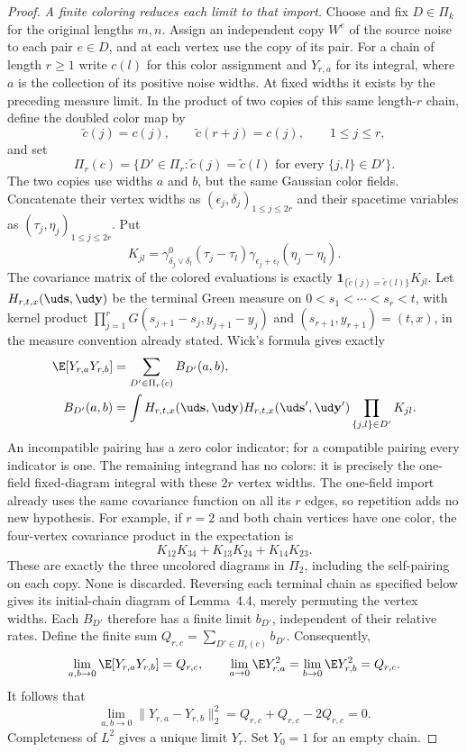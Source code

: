 \begin{proof}
\emph{A finite coloring reduces each limit to that import.}
Choose and fix $D\in\Pi_k$ for the original lengths $m,n$.
Assign an independent copy $W^e$ of the source noise to each pair
$e\in D$, and at each vertex use the copy of its pair. For a chain
of length $r\ge1$ write $c(l)$ for this color assignment and
$Y_{r,a}$ for its integral, where $a$ is the collection of its positive
noise widths. At fixed widths it exists by the preceding measure limit.
In the product of two copies of this same length-$r$ chain, define
the doubled color map by
\[
  \widetilde c(j)=c(j),\qquad
  \widetilde c(r+j)=c(j),\qquad 1\le j\le r,
\]
and set
\[
  \Pi_r(c)=\{D'\in\Pi_r:
  \widetilde c(j)=\widetilde c(l)
  \text{ for every }\{j,l\}\in D'\}.
\]
The two copies use widths $a$ and $b$, but the same Gaussian color
fields. Concatenate their vertex widths as
$(\epsilon_j,\delta_j)_{1\le j\le2r}$ and their spacetime variables
as $(\tau_j,\eta_j)_{1\le j\le2r}$. Put
\[
  K_{jl}=\gamma^0_{\delta_j\vee\delta_l}(\tau_j-\tau_l)
  \gamma_{\epsilon_j+\epsilon_l}(\eta_j-\eta_l).
\]
The covariance matrix of the colored evaluations is exactly
$\mathbf1_{\{\widetilde c(j)=\widetilde c(l)\}}K_{jl}$.
Let $H_{r,t,x}(\ud\mathbf s,\ud\mathbf y)$ be the terminal
Green measure on $0<s_1<\cdots<s_r<t$, with kernel product
$\prod_{j=1}^rG(s_{j+1}-s_j,y_{j+1}-y_j)$ and
$(s_{r+1},y_{r+1})=(t,x)$, in the measure convention already stated.
Wick's formula gives exactly
\[
  \begin{split}
    \E[Y_{r,a}Y_{r,b}]&=\sum_{D'\in\Pi_r(c)}B_{D'}(a,b),\\
    B_{D'}(a,b)&=\int H_{r,t,x}(\ud\mathbf s,\ud\mathbf y)
    H_{r,t,x}(\ud\mathbf s',\ud\mathbf y')
    \prod_{\{j,l\}\in D'}K_{jl}.
  \end{split}
\]
An incompatible pairing has a zero color indicator; for a compatible
pairing every indicator is one. The remaining integrand has no colors:
it is precisely the one-field fixed-diagram integral with these $2r$
vertex widths. The one-field import already uses the same covariance
function on all its $r$ edges, so repetition adds no new hypothesis.
For example, if $r=2$ and both chain vertices have one color, the
four-vertex covariance product in the expectation is
\[
  K_{12}K_{34}+K_{13}K_{24}+K_{14}K_{23}.
\]
These are exactly the three uncolored diagrams in $\Pi_2$, including
the self-pairing on each copy. None is discarded.
Reversing each terminal chain as specified below gives its initial-chain
diagram of Lemma~4.4, merely permuting the vertex widths. Each
$B_{D'}$ therefore has a finite limit $b_{D'}$, independent of their
relative rates. Define the finite sum
$Q_{r,c}=\sum_{D'\in\Pi_r(c)}b_{D'}$. Consequently,
\[
  \lim_{a,b\to0}\E[Y_{r,a}Y_{r,b}]=Q_{r,c},\qquad
  \lim_{a\to0}\E Y_{r,a}^2=\lim_{b\to0}\E Y_{r,b}^2=Q_{r,c}.
\]
It follows that
\[
  \lim_{a,b\to0}\|Y_{r,a}-Y_{r,b}\|_2^2
  =Q_{r,c}+Q_{r,c}-2Q_{r,c}=0.
\]
Completeness of $L^2$ gives a unique limit $Y_r$. Set $Y_0=1$
for an empty chain.


\end{proof}

